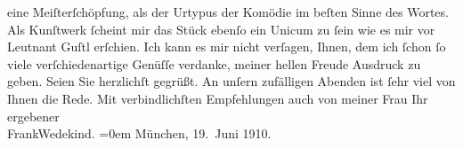 \begin{ledgroupsized}[t]{13cm}
                    eine Meiſterſchöpfung, als der Urtypus der Komödie im beſten Sinne des Wortes.
                        {\pb}Als Kunſtwerk ſcheint mir das
                    Stück ebenſo ein Unicum zu ſein wie es mir vor \label{K_L01937_2v}\label{K_L01937_2h}{ }Leutnant Guſtl erſchien. Ich kann es mir nicht
                    verſagen, Ihnen, dem ich ſchon ſo viele verſchiedenartige Genüſſe verdanke,
                    meiner hellen Freude Ausdruck zu geben.\pend
           \pstart
           {\pb}Seien Sie herzlichſt gegrüßt. An
                    unſern zufälligen Abenden ist ſehr viel von Ihnen die Rede.\pend
           \pstart
           Mit verbindlichſten Empfehlungen auch von meiner Frau\pend
           \pstart
           Ihr ergebener{\\[\baselineskip]}\spacefill\mbox{FrankWedekind.}\pend
           \leftskip=0em{}\pstart
           München, 19. Juni
                        1910.\pend
                     \endnumbering{}\end{ledgroupsized}  \newcommand{\dateiname}{L01937}\newcommand{\titel}{Frank Wedekind an Arthur Schnitzler, 19. 6. 1910}\newcommand{\editorInnen}{Martin Anton Müller und Gerd-Hermann Susen}
            \footnotesize
\begin{ledgroupsized}[t]{11.5cm}
\end{ledgroupsized}
         
      